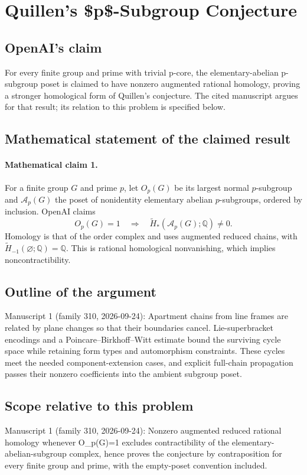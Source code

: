 \documentclass[11pt]{article}
\begin{document}
\section*{Quillen's \$p\$-Subgroup Conjecture}

\subsection{OpenAI's claim}
For every finite group and prime with trivial p-core, the elementary-abelian p-subgroup poset is claimed to have nonzero augmented rational homology, proving a stronger homological form of Quillen's conjecture. The cited manuscript argues for that result; its relation to this problem is specified below.

\subsection{Mathematical statement of the claimed result}
\paragraph{Mathematical claim 1.} For a finite group $G$ and prime $p$, let $O_p(G)$ be its largest normal $p$-subgroup and $\mathcal A_p(G)$ the poset of nonidentity elementary abelian $p$-subgroups, ordered by inclusion. OpenAI claims
\[
O_p(G)=1\quad\Longrightarrow\quad\widetilde H_*(\mathcal A_p(G);\mathbb Q)\ne0.
\]
Homology is that of the order complex and uses augmented reduced chains, with $\widetilde H_{-1}(\varnothing;\mathbb Q)=\mathbb Q$. This is rational homological nonvanishing, which implies noncontractibility.

\subsection{Outline of the argument}
Manuscript 1 (family 310, 2026-09-24): Apartment chains from line frames are related by plane changes so that their boundaries cancel. Lie-superbracket encodings and a Poincare--Birkhoff--Witt estimate bound the surviving cycle space while retaining form types and automorphism constraints. These cycles meet the needed component-extension cases, and explicit full-chain propagation passes their nonzero coefficients into the ambient subgroup poset.

\subsection{Scope relative to this problem}
Manuscript 1 (family 310, 2026-09-24): Nonzero augmented reduced rational homology whenever O\_p(G)=1 excludes contractibility of the elementary-abelian-subgroup complex, hence proves the conjecture by contraposition for every finite group and prime, with the empty-poset convention included.
\end{document}
